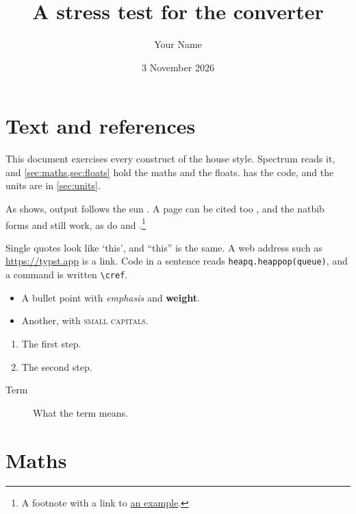 \documentclass[11pt,a4paper]{article}   %
\title{A stress test for the converter}
\author{Your Name}
\date{3 November 2026}
\numberwithin{equation}{section}
\numberwithin{figure}{section}
\numberwithin{table}{section}
\theoremstyle{plain}                    %
\theoremstyle{definition}               %
\theoremstyle{remark}                   %
\newcommand{\tool}{Spectrum}
\begin{document}
\maketitle

\section{Text and references}\label{sec:text}

This document exercises every construct of the house style. \tool{} reads it, and
\cref{sec:maths,sec:floats} hold the maths and the floats.  has the code,
and the units are in \cref{sec:units}.

As \textcite{Masters2013} shows, output follows the sun \parencite{Duffie2013}. A page can
be cited too \parencite[p.~12]{Lamport1994}, and the natbib forms \citet{Knuth1984} and
\citep{Masters2013,Duffie2013} still work, as do \citeauthor{Knuth1984} and
\citeyear{Lamport1994}.\footnote{A footnote with a link to \href{https://example.com}{an example}.}


Single quotes look like `this', and \enquote{this} is the same. A web address such as
\url{https://typst.app} is a link. Code in a sentence reads \lstinline[language=Python]|heapq.heappop(queue)|,
and a command is written \verb|\cref|.

\begin{itemize}
  \item A bullet point with \emph{emphasis} and \textbf{weight}.
  \item Another, with \textsc{small capitals}.
\end{itemize}

\begin{enumerate}
  \item The first step.
  \item The second step.
\end{enumerate}

\begin{description}
  \item[Term] What the term means.
\end{description}

\section{Maths}\label{sec:maths}
\end{document}
